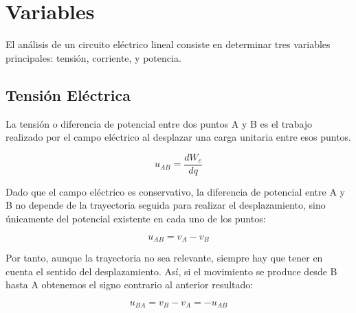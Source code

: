 \chapter{Variables}
\label{cha:variables}
El análisis de un circuito eléctrico lineal consiste en determinar tres variables principales: tensión, corriente, y potencia.

\section{Tensión Eléctrica}
\label{sec:tension}

La tensión o diferencia de potencial entre dos puntos A y B es el trabajo realizado por el campo eléctrico al desplazar una carga unitaria entre esos puntos. 


\begin{equation}
u_{AB} = \frac{dW_{e}}{dq}\label{eq:uab}
\end{equation}

Dado que el campo eléctrico es conservativo, la diferencia de potencial entre A y B no depende de la trayectoria seguida para realizar el desplazamiento, sino únicamente del potencial existente en cada uno de los puntos:

\begin{equation}
  \label{eq:potencial}
  u_{AB} = v_A - v_B
\end{equation}

Por tanto, aunque la trayectoria no sea relevante, siempre hay que tener en cuenta el sentido del desplazamiento. Así, si el movimiento se produce desde B hasta A obtenemos el signo contrario al anterior resultado:

\begin{equation}
  \label{eq:signo_tension}
  u_{BA} = v_B - v_A = - u_{AB} 
\end{equation}


